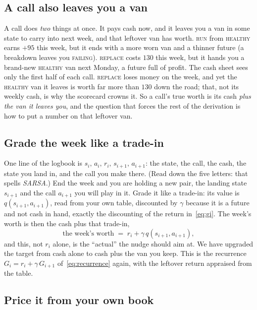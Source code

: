 \documentclass[11pt,a4paper]{article}
\theoremstyle{definition}
\theoremstyle{remark}
\numberwithin{equation}{section}
\newcommand{\sa}[1]{\textsc{#1}}   %
\begin{document}
\subsection*{A call also leaves you a van}

A call does \emph{two} things at once. It pays cash now, and it leaves you a van in some state
to carry into next week, and that leftover van has worth. \sa{run} from \sa{healthy} earns
$+95$ this week, but it ends with a more worn van and a thinner future (a breakdown leaves you
\sa{failing}). \sa{replace} costs $130$ this week, but it hands you a brand-new \sa{healthy} van
next Monday, a future full of profit. The cash sheet sees only the first half of each call.
\sa{replace} loses money on the week, and yet the \sa{healthy} van it leaves is worth far more
than $130$ down the road; that, not its weekly cash, is why the scorecard crowns it. So a
call's true worth is its cash \emph{plus the van it leaves you}, and the question that forces
the rest of the derivation is how to put a number on that leftover van.

\subsection*{Grade the week like a trade-in}

One line of the logbook is $s_i,\, a_i,\, r_i,\, s_{i+1},\, a_{i+1}$: the state, the call, the
cash, the state you land in, and the call you make there. (Read down the five letters: that
spells \emph{SARSA}.) End the week and you are holding a new pair, the landing state
$s_{i+1}$ and the call $a_{i+1}$ you will play in it. Grade it like a trade-in: its value is
$q(s_{i+1}, a_{i+1})$, read from your own table, discounted by $\gamma$ because it is a future
and not cash in hand, exactly the discounting of the return in~\eqref{eq:gi}. The week's worth
is then the cash plus that trade-in,
\[
\text{the week's worth} \;=\; r_i + \gamma\, q(s_{i+1}, a_{i+1}),
\]
and this, not $r_i$ alone, is the ``actual'' the nudge should aim at. We have upgraded the
target from cash alone to cash plus the van you keep. This is the recurrence
$G_i = r_i + \gamma\, G_{i+1}$ of~\eqref{eq:recurrence} again, with the leftover return
appraised from the table.

\subsection*{Price it from your own book}
\end{document}
